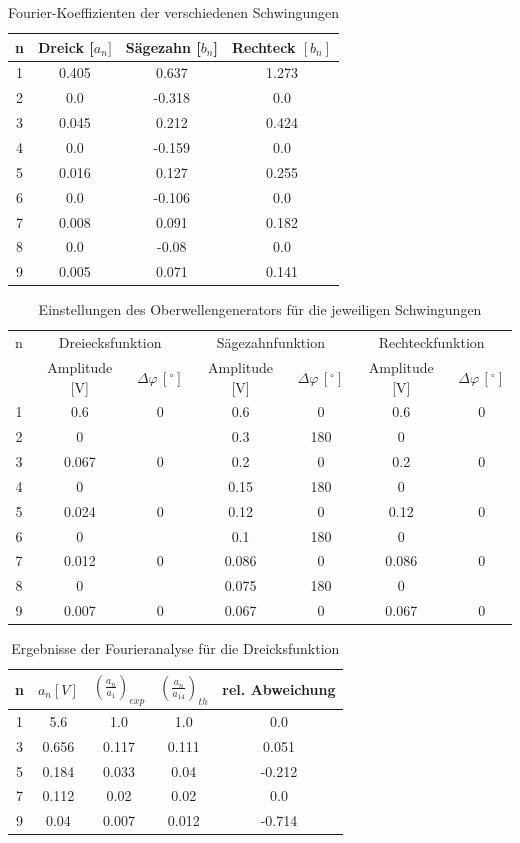 \documentclass[11pt,ngerman,a4paper]{article}
\begin{document}
\newpage
\begin{table}
\centering
\begin{tabular}{|c|c|c|c|}

\hline
n & Dreick [$a_n]$ & S\"agezahn [$b_n$] & Rechteck $[b_n]$ \\
\hline
1 & 0.405 & 0.637 & 1.273\\
2 & 0.0 & -0.318 & 0.0\\
3 & 0.045 & 0.212 & 0.424\\
4 & 0.0 & -0.159 & 0.0\\
5 & 0.016 & 0.127 & 0.255\\
6 & 0.0 & -0.106 & 0.0\\
7 & 0.008 & 0.091 & 0.182\\
8 & 0.0 & -0.08 & 0.0\\
9 & 0.005 & 0.071 & 0.141\\
\hline
\end{tabular}
\label{table1}
\caption{Fourier-Koeffizienten der verschiedenen Schwingungen}
\end{table}

\begin{table}
\centering
\begin{tabular}{|c||c|c||c|c||c|c|}
\hline
n & \multicolumn{2}{c||}{Dreiecksfunktion} & \multicolumn{2}{c||}{Sägezahnfunktion} & \multicolumn{2}{c|}{Rechteckfunktion} \\
 & Amplitude [V] & $\Delta \varphi\,[^\circ]$ & Amplitude [V] & $\Delta \varphi\,[^\circ]$ & Amplitude [V] & $\Delta \varphi\,[^\circ]$ \\
\hline
1 & 0.6 & 0 & 0.6 & 0 & 0.6 & 0\\
2 & 0 &  & 0.3 & 180 & 0& \\
3 & 0.067 & 0 & 0.2 & 0 & 0.2 & 0\\
4 & 0 &  & 0.15 & 180 & 0 & \\
5 & 0.024 & 0 & 0.12 & 0 & 0.12 & 0\\
6 & 0 &  & 0.1 & 180 & 0 & \\
7 & 0.012 & 0 & 0.086 & 0 & 0.086 & 0\\
8 & 0 &  & 0.075 & 180 & 0 & \\
9 & 0.007 & 0 & 0.067 & 0 & 0.067 & 0\\
\hline
\end{tabular}
\label{settings}
\caption{Einstellungen des Oberwellengenerators für die jeweiligen Schwingungen}
\end{table}
\begin{table}
\centering
\begin{tabular}{|c|c|c|c|c|}
\hline
n & $a_n [V]$ & $(\frac{a_n}{a_1})_{exp}$ & $(\frac{a_n}{a_14})_{th}$ & rel. Abweichung\\
\hline
1&5.6 & 1.0 & 1.0 & 0.0\\
3&0.656 & 0.117 & 0.111 & 0.051\\
5&0.184 & 0.033 & 0.04 & -0.212\\
7&0.112 & 0.02 & 0.02 & 0.0\\
9&0.04 & 0.007 & 0.012 & -0.714\\
\hline
\end{tabular}
\label{hut}
\caption{Ergebnisse der Fourieranalyse für die Dreicksfunktion}
\end{table}
\end{document}
